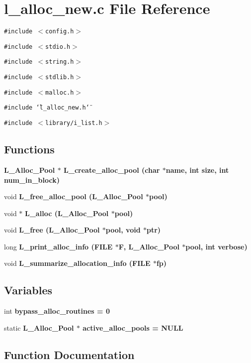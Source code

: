 \section{l\_\-alloc\_\-new.c File Reference}
\label{l__alloc__new_8c}
{\tt \#include $<$config.h$>$}\par
{\tt \#include $<$stdio.h$>$}\par
{\tt \#include $<$string.h$>$}\par
{\tt \#include $<$stdlib.h$>$}\par
{\tt \#include $<$malloc.h$>$}\par
{\tt \#include \char`\"{}l\_\-alloc\_\-new.h\char`\"{}}\par
{\tt \#include $<$library/i\_\-list.h$>$}\par
\subsection*{Functions}
\begin{CompactItemize}
\item 
\bf{L\_\-Alloc\_\-Pool} $\ast$ \bf{L\_\-create\_\-alloc\_\-pool} (char $\ast$\bf{name}, int size, int num\_\-in\_\-block)
\item 
void \bf{L\_\-free\_\-alloc\_\-pool} (\bf{L\_\-Alloc\_\-Pool} $\ast$pool)
\item 
void $\ast$ \bf{L\_\-alloc} (\bf{L\_\-Alloc\_\-Pool} $\ast$pool)
\item 
void \bf{L\_\-free} (\bf{L\_\-Alloc\_\-Pool} $\ast$pool, void $\ast$ptr)
\item 
long \bf{L\_\-print\_\-alloc\_\-info} (FILE $\ast$\bf{F}, \bf{L\_\-Alloc\_\-Pool} $\ast$pool, int \bf{verbose})
\item 
void \bf{L\_\-summarize\_\-allocation\_\-info} (FILE $\ast$fp)
\end{CompactItemize}
\subsection*{Variables}
\begin{CompactItemize}
\item 
int \bf{bypass\_\-alloc\_\-routines} = 0
\item 
static \bf{L\_\-Alloc\_\-Pool} $\ast$ \bf{active\_\-alloc\_\-pools} = NULL
\end{CompactItemize}


\subsection{Function Documentation}
